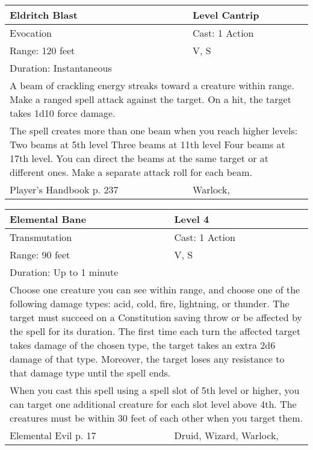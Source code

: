 \documentclass[11pt]{report}
\begin{document}
\begin{table}[H]
	\begin{tabular}{||p{6cm}|p{6cm}||}
		\hline\hline
		\bf{Eldritch Blast} & Level Cantrip\\ \hline
		Evocation & Cast: 1 Action\\ \hline
		Range: 120 feet & V, S\\ \hline
		Duration: Instantaneous & \\ \hline
		\multicolumn{2}{||p{12cm}||}{A beam of crackling energy streaks toward a creature within range. Make a ranged spell attack against the target. On a hit, the target takes 1d10 force damage.}\\ \hline
		\multicolumn{2}{||p{12cm}||}{The spell creates more than one beam when you reach higher levels: 
Two beams at 5th level
Three beams at 11th level
Four beams at 17th level. 
You can direct the beams at the same target or at different ones. Make a separate attack roll for each beam.}\\ \hline
Player's Handbook p. 237 & Warlock, \\ \hline\hline
	\end{tabular}
\end{table}

\begin{table}[H]
	\begin{tabular}{||p{6cm}|p{6cm}||}
		\hline\hline
		\bf{Elemental Bane} & Level 4\\ \hline
		Transmutation & Cast: 1 Action\\ \hline
		Range: 90 feet & V, S\\ \hline
		Duration: Up to 1 minute & \\ \hline
		\multicolumn{2}{||p{12cm}||}{Choose one creature you can see within range, and choose one of the following damage types: acid, cold, fire, lightning, or thunder.
The target must succeed on a Constitution saving throw or be affected by the spell for its duration. The first time each turn the affected target takes damage of the chosen type, the target takes an extra 2d6 damage of that type. Moreover, the target loses any resistance to that damage type until the spell ends.}\\ \hline
		\multicolumn{2}{||p{12cm}||}{When you cast this spell using a spell slot of 5th level or higher, you can target one additional creature for each slot level above 4th. The creatures must be within 30 feet of each other when you target them.}\\ \hline
Elemental Evil p. 17 & Druid, Wizard, Warlock, \\ \hline\hline
	\end{tabular}
\end{table}
\end{document}
